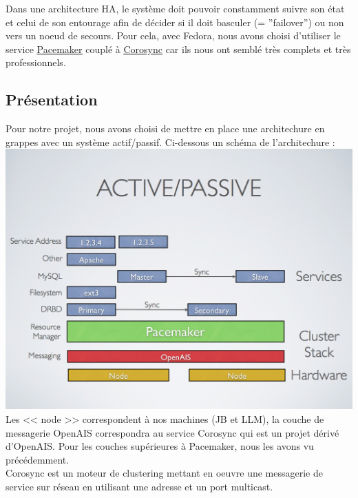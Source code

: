 \documentclass[11pt,a4paper]{report}
\begin{document}
            Dans une architecture HA, le système doit pouvoir constamment suivre son état et celui de son entourage afin de décider si il doit basculer (= ''failover'') ou non vers un noeud de secours. Pour cela, avec Fedora, nous avons choisi d'utiliser le service \underline{\href{http://clusterlabs.org}{Pacemaker}} couplé à \underline{\href{http://www.corosync.org}{Corosync}} car ils nous ont semblé très complets et très professionnels.
            
            \subsection{Présentation}
                
                Pour notre projet, nous avons choisi de mettre en place une architechure en grappes avec un système actif/passif. Ci-dessous un schéma de l'architechure :\\
                
                \includegraphics[keepaspectratio=true, width=\textwidth]{content/pacemaker-active-passive.png}\\[1cm]
                
                Les << node >> correspondent à nos machines (JB et LLM), la couche de messagerie OpenAIS correspondra au service Corosync qui est un projet dérivé d'OpenAIS. Pour les couches supérieures à Pacemaker, nous les avons vu précédemment.\\
                
                Corosync est un moteur de clustering mettant en oeuvre une messagerie de service sur réseau en utilisant une adresse et un port multicast.
            
\end{document}
